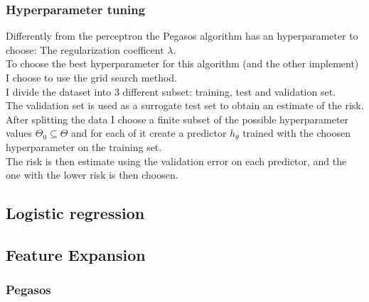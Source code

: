 \subsubsection{Hyperparameter tuning}
Differently from the perceptron the Pegasos algorithm has an hyperparameter to choose: The regularization coefficent $\lambda$.\\
To choose the best hyperparameter for this algorithm (and the other implement) I choose to use the grid search method.\\
I divide the dataset into 3 different subset: training, test and validation set.\\
The validation set is used as a surrogate test set to obtain an estimate of the risk.\\
After splitting the data I choose a finite subset of the possible hyperparameter values $\Theta_0 \subseteq \Theta$ and for each of it create a predictor $h_\theta$ trained with the choosen hyperparameter on the training set.\\
The risk is then estimate using the validation error on each predictor, and the one with the lower risk is then choosen.

\subsection{Logistic regression}
\subsection{Feature Expansion}
\subsubsection{Pegasos}
